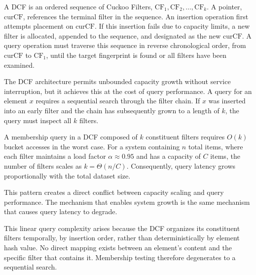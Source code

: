\begin{definition} \label{def:dynamic-cuckoo}
    A DCF is an ordered sequence of Cuckoo Filters, $\text{CF}_1, \text{CF}_2, \ldots, \text{CF}_k$. A pointer, $\text{curCF}$, references the terminal filter in the sequence. An insertion operation first attempts placement on $\text{curCF}$. If this insertion fails due to capacity limits, a new filter is allocated, appended to the sequence, and designated as the new $\text{curCF}$. A query operation must traverse this sequence in reverse chronological order, from $\text{curCF}$ to $\text{CF}_1$, until the target fingerprint is found or all filters have been examined.
\end{definition}

The DCF architecture permits unbounded capacity growth without service interruption, but it achieves this at the cost of query performance. A query for an element $x$ requires a sequential search through the filter chain. If $x$ was inserted into an early filter and the chain has subsequently grown to a length of $k$, the query must inspect all $k$ filters.

\begin{proposition}
    A membership query in a DCF composed of $k$ constituent filters requires $O(k)$ bucket accesses in the worst case. For a system containing $n$ total items, where each filter maintains a load factor $\alpha \approx 0.95$ and has a capacity of $C$ items, the number of filters scales as $k = \Theta(n/C)$. Consequently, query latency grows proportionally with the total dataset size.
\end{proposition}

This pattern creates a direct conflict between capacity scaling and query performance. The mechanism that enables system growth is the same mechanism that causes query latency to degrade.

This linear query complexity arises because the DCF organizes its constituent filters temporally, by insertion order, rather than deterministically by element hash value. No direct mapping exists between an element's content and the specific filter that contains it. Membership testing therefore degenerates to a sequential search.


